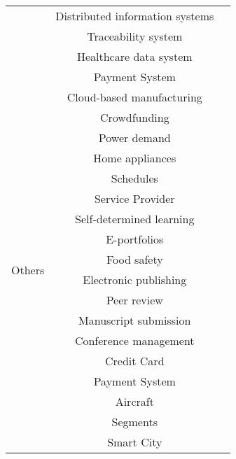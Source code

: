 \begin{longtable}{ |c|c|p{4cm}| }
	 & Distributed information systems & \cite{2016_Azaria} \\ \cline{2-3}
	 & Traceability system & \cite{2016_Tian} \\ \cline{2-3}
	 & Healthcare data system & \cite{2016_Yue} \\ \cline{2-3}
	 & Payment System & \cite{2017_Jaag} \\
	 \hline
	 \multirow{18}{*}{Others} & Cloud-based manufacturing & \cite{2016_Bahga} \\ \cline{2-3}
	 & Crowdfunding & \cite{2016_Jacynycz} \\ \cline{2-3}
	 & Power demand & \multirow{3}{*}{\cite{2016_Kianmajd}} \\ \cline{2-2}
	 & Home appliances &  \\ \cline{2-2}
	 & Schedules &  \\ \cline{2-3}
	 & Service Provider & \cite{2016_Schaub} \\ \cline{2-3}
	 & Self-determined learning & \multirow{2}{*}{\cite{2016_Sharples}} \\ \cline{2-2}
	 & E-portfolios & \\ \cline{2-3}
	 & Food safety & \cite{2016_Tian} \\ \cline{2-3}
	 & Electronic publishing & \multirow{4}{*}{\cite{2017_Gipp}} \\ \cline{2-2}
	 & Peer review & \\ \cline{2-2}
	 & Manuscript   submission & \\ \cline{2-2}
	 & Conference management & \\ \cline{2-3}
	 & Credit Card & \multirow{2}{*}{\cite{2017_Jaag}} \\ \cline{2-2}
	 & Payment System & \\ \cline{2-3}
	 & Aircraft & \multirow{2}{*}{\cite{2017_Madhwal}} \\ \cline{2-2}
	 & Segments &  \\ \cline{2-3}
	 & Smart City & \cite{2018_Alessandra} \\
	 \hline
\end{longtable}

